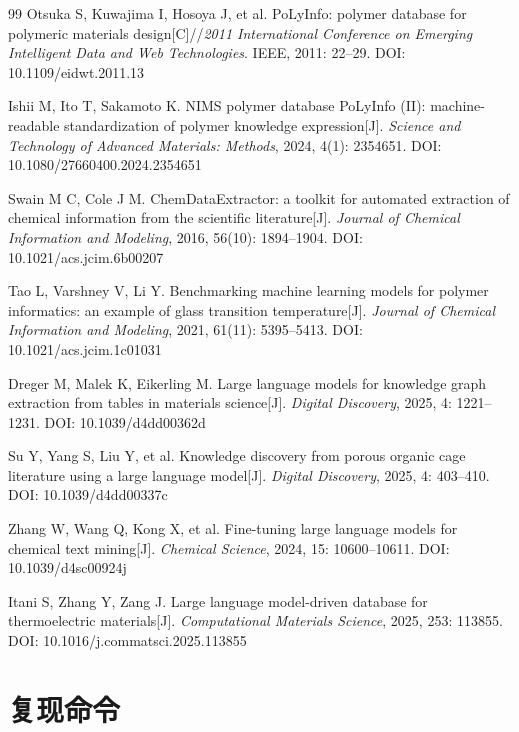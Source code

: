 \documentclass[11pt,a4paper]{ctexart}
\begin{document}
\begin{thebibliography}{99}
 Otsuka S, Kuwajima I, Hosoya J, et al. PoLyInfo: polymer database for polymeric materials design[C]//\textit{2011 International Conference on Emerging Intelligent Data and Web Technologies}. IEEE, 2011: 22--29. DOI: 10.1109/eidwt.2011.13

 Ishii M, Ito T, Sakamoto K. NIMS polymer database PoLyInfo (II): machine-readable standardization of polymer knowledge expression[J]. \textit{Science and Technology of Advanced Materials: Methods}, 2024, 4(1): 2354651. DOI: 10.1080/27660400.2024.2354651

 Swain M C, Cole J M. ChemDataExtractor: a toolkit for automated extraction of chemical information from the scientific literature[J]. \textit{Journal of Chemical Information and Modeling}, 2016, 56(10): 1894--1904. DOI: 10.1021/acs.jcim.6b00207

 Tao L, Varshney V, Li Y. Benchmarking machine learning models for polymer informatics: an example of glass transition temperature[J]. \textit{Journal of Chemical Information and Modeling}, 2021, 61(11): 5395--5413. DOI: 10.1021/acs.jcim.1c01031

 Dreger M, Malek K, Eikerling M. Large language models for knowledge graph extraction from tables in materials science[J]. \textit{Digital Discovery}, 2025, 4: 1221--1231. DOI: 10.1039/d4dd00362d

 Su Y, Yang S, Liu Y, et al. Knowledge discovery from porous organic cage literature using a large language model[J]. \textit{Digital Discovery}, 2025, 4: 403--410. DOI: 10.1039/d4dd00337c

 Zhang W, Wang Q, Kong X, et al. Fine-tuning large language models for chemical text mining[J]. \textit{Chemical Science}, 2024, 15: 10600--10611. DOI: 10.1039/d4sc00924j

 Itani S, Zhang Y, Zang J. Large language model-driven database for thermoelectric materials[J]. \textit{Computational Materials Science}, 2025, 253: 113855. DOI: 10.1016/j.commatsci.2025.113855
\end{thebibliography}

\appendix
\section{复现命令}
\end{document}
